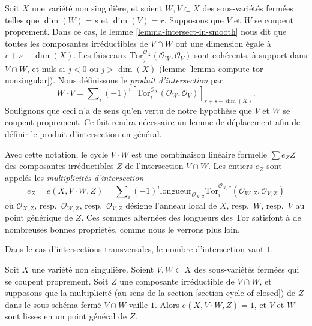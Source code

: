\noindent
Soit $X$ une variété non singulière, et soient $W, V \subset X$
des sous-variétés fermées telles que $\dim(W) = s$ et $\dim(V) = r$.
Supposons que $V$ et $W$ se coupent proprement.
Dans ce cas, le lemme \ref{lemma-intersect-in-smooth} nous dit que toutes les composantes
irréductibles de $V \cap W$ ont une dimension égale à $r + s - \dim(X)$.
Les faisceaux $\text{Tor}_j^{\mathcal{O}_X}(\mathcal{O}_W, \mathcal{O}_V)$ sont
cohérents, à support dans $V \cap W$, et nuls si $j < 0$ ou $j > \dim(X)$
(lemme \ref{lemma-compute-tor-nonsingular}).
Nous définissons le {\it produit d'intersection} par
$$
W \cdot V = \sum\nolimits_i (-1)^i
[\text{Tor}_i^{\mathcal{O}_X}(\mathcal{O}_W, \mathcal{O}_V)]_{r + s - \dim(X)}.
$$
Soulignons que ceci n'a de sens qu'en vertu de notre hypothèse que
$V$ et $W$ se coupent proprement. Ce fait rendra nécessaire un lemme de
déplacement afin de définir le produit d'intersection en général.

\medskip\noindent
Avec cette notation, le cycle $V \cdot W$ est une combinaison linéaire
formelle $\sum e_Z Z$ des composantes irréductibles $Z$
de l'intersection $V \cap W$. Les entiers $e_Z$ sont appelés
les {\it multiplicités d'intersection}
$$
e_Z = e(X, V \cdot W, Z) =
\sum\nolimits_i
(-1)^i
\text{longueur}_{\mathcal{O}_{X, Z}}
\text{Tor}_i^{\mathcal{O}_{X, Z}}(\mathcal{O}_{W, Z}, \mathcal{O}_{V, Z})
$$
où $\mathcal{O}_{X, Z}$, resp.\ $\mathcal{O}_{W, Z}$,
resp.\ $\mathcal{O}_{V, Z}$ désigne l'anneau local de $X$, resp.\ $W$,
resp.\ $V$ au point générique de $Z$.
Ces sommes alternées des longueurs des $\text{Tor}$ satisfont à de nombreuses bonnes
propriétés, comme nous le verrons plus loin.

\medskip\noindent
Dans le cas d'intersections transversales, le nombre d'intersection vaut $1$.

\begin{lemma}
\label{lemma-transversal}
Soit $X$ une variété non singulière. Soient $V, W \subset X$ des
sous-variétés fermées qui se coupent proprement. Soit $Z$ une composante irréductible
de $V \cap W$, et supposons que la multiplicité
(au sens de la section \ref{section-cycle-of-closed}) de $Z$
dans le sous-schéma fermé $V \cap W$ vaille $1$.
Alors $e(X, V \cdot W, Z) = 1$, et $V$ et $W$ sont lisses
en un point général de $Z$.
\end{lemma}

